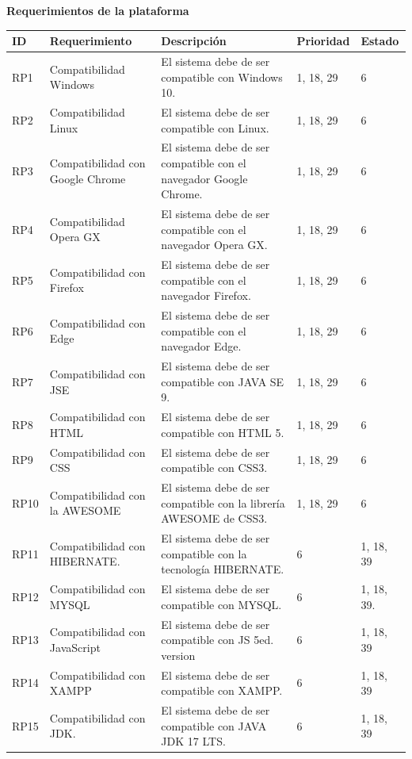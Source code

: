 \documentclass{article}
\begin{document}
	\textbf{Requerimientos de la plataforma}\\
	\begin{longtable}{|p{1.0cm}|p{3.0cm}|p{5.0cm}|p{1.2cm}|p{0.75cm}|}
	\hline
	\textbf{ID} & \textbf{Requerimiento} & \textbf{Descripción} & \textbf{Prioridad} & \textbf{Estado} \\
	\hline

	RP1 &
	Compatibilidad Windows &
	El sistema debe de ser compatible con Windows 10. &
	1, 18, 29 &
	6 \\ \hline

	RP2 &
	Compatibilidad Linux &
	El sistema debe de ser compatible con Linux. &
	1, 18, 29 &
	6 \\ \hline

	RP3 &
	Compatibilidad con Google Chrome &
	El sistema debe de ser compatible con el navegador Google Chrome. &
	1, 18, 29 &
	6 \\ \hline

	RP4 &
	Compatibilidad Opera GX &
	El sistema debe de ser compatible con el navegador Opera GX. &
	1, 18, 29 &
	6 \\ \hline

	RP5 &
	Compatibilidad con Firefox &
	El sistema debe de ser compatible con el navegador Firefox. &
	1, 18, 29 &
	6 \\ \hline

	RP6 &
	Compatibilidad con Edge &
	El sistema debe de ser compatible con el navegador Edge. &
	1, 18, 29 &
	6 \\ \hline

	RP7 &
	Compatibilidad con JSE &
	El sistema debe de ser compatible con JAVA SE 9. &
	1, 18, 29 &
	6 \\ \hline

	RP8 &
	Compatibilidad con HTML &
	El sistema debe de ser compatible con HTML 5. &
	1, 18, 29 &
	6 \\ \hline

	RP9 &
	Compatibilidad con CSS &
	El sistema debe de ser compatible con CSS3. &
	1, 18, 29 &
	6 \\ \hline

	RP10 &
	Compatibilidad con la AWESOME &
	El sistema debe de ser compatible con la librería AWESOME de CSS3. &
	1, 18, 29 &
	6 \\ \hline

	RP11 & Compatibilidad con HIBERNATE. & El sistema debe de ser compatible con la tecnología HIBERNATE. & 6 & 1, 18, 39 \\
	\hline
	RP12 & Compatibilidad con MYSQL & El sistema debe de ser compatible con MYSQL. & 6 & 1, 18, 39.\\
	\hline
	RP13 & Compatibilidad con JavaScript & El sistema debe de ser compatible con JS 5ed. version & 6 & 1, 18, 39\\
	\hline
	RP14 & Compatibilidad con XAMPP & El sistema debe de ser compatible con XAMPP. & 6 & 1, 18, 39\\
	\hline
	RP15 & Compatibilidad con JDK. & El sistema debe de ser compatible con JAVA JDK 17 LTS. & 6 & 1, 18, 39\\  \hline
	\end{longtable}
\end{document}
